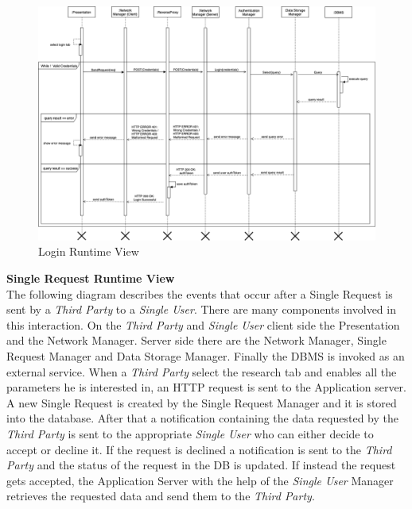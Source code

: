 \documentclass[titlepage]{article}
\begin{document}
	\begin{figure}[H]
		\center
		\includegraphics[width=15cm]{Login_RuntimeView.png}
		\caption{Login Runtime View}
		\label{fig:LOG}
	\end{figure}
	\noindent
	{\bf Single Request Runtime View }\\ 
	The following diagram describes the events that occur after a Single Request is sent by a {\it Third Party} to a {\it Single User}. There are many components involved in this interaction. On the {\it Third Party} and {\it Single User} client side the Presentation and the Network Manager. Server side there are the Network Manager, Single Request Manager and Data Storage Manager. Finally the DBMS is invoked as an external service.
	When a {\it Third Party} select the research tab and enables all the parameters he is interested in, an HTTP request is sent to the Application server. A new Single Request is created by the Single Request Manager and it is stored into the database. After that a notification containing the data requested by the {\it Third Party} is sent to the appropriate {\it Single User} who can either decide to accept or decline it. If the request is declined a notification is sent to the {\it Third Party} and the status of the request in the DB is updated. If instead the request gets accepted, the Application Server with the help of the {\it Single User} Manager retrieves the requested data and send them to the {\it Third Party}.
	
\end{document}
